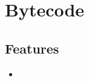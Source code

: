 \section{Bytecode}
\label{module:Bytecode}

\subsection{Features}
\begin{itemize}
	\item {}
\end{itemize}

\TODO
